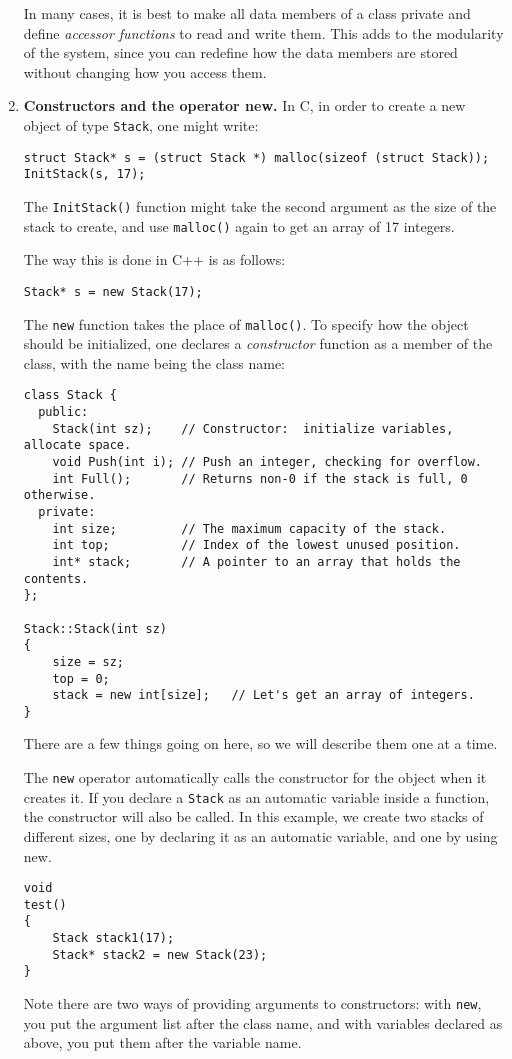 \begin{enumerate}
In many cases, it is best to make all data members of a class private
and define {\em accessor functions} to read and write them.  This adds
to the modularity of the system, since you can redefine how the data
members are stored without changing how you access them.

\item {\bf Constructors and the operator new.}  In C, in
order to create a new object of type {\tt Stack}, one might write:
\begin{verbatim}
struct Stack* s = (struct Stack *) malloc(sizeof (struct Stack));
InitStack(s, 17);
\end{verbatim}
The {\tt InitStack()} function might take the second argument as the
size of the stack to create, and use {\tt malloc()} again to get an
array of 17 integers.

The way this is done in C++ is as follows:
\begin{verbatim}
Stack* s = new Stack(17);
\end{verbatim}
The {\tt new} function takes the place of {\tt malloc()}.  To
specify how the object should be initialized, one declares a {\it
constructor} function as a member of the class, with the name being
the class name:
\begin{verbatim}
class Stack {
  public:
    Stack(int sz);    // Constructor:  initialize variables, allocate space.
    void Push(int i); // Push an integer, checking for overflow.
    int Full();       // Returns non-0 if the stack is full, 0 otherwise.
  private:
    int size;         // The maximum capacity of the stack.
    int top;          // Index of the lowest unused position.
    int* stack;       // A pointer to an array that holds the contents.
};

Stack::Stack(int sz)
{
    size = sz;
    top = 0;
    stack = new int[size];   // Let's get an array of integers.
}
\end{verbatim}
There are a few things going on here, so we will describe them one at
a time.

The {\tt new} operator automatically calls the constructor for the
object when it creates it.  If you declare a {\tt Stack} as an
automatic variable inside a function, the constructor will also be
called.  In this example, we create two stacks of different sizes, one
by declaring it as an automatic variable, and one by using new.
\begin{verbatim}
void
test()
{
    Stack stack1(17);
    Stack* stack2 = new Stack(23); 
}
\end{verbatim}
Note there are two ways of providing arguments to constructors: with
{\tt new}, you put the argument list after the class name, and with
variables declared as above, you put them after the variable name.


\end{enumerate}
